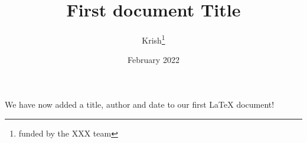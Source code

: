 \documentclass[12pt, letterpaper, twoside]{article}
\title{First document Title}
\author{Krish\thanks{funded by the XXX team}}
\date{February 2022}
\begin{document}
\maketitle

We have now added a title, author and date to our first \LaTeX{} document!
\end{document}
